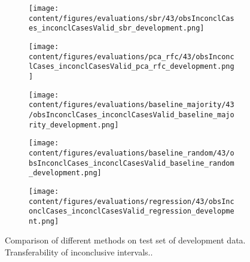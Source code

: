 \begin{figure}[ht]
  \begin{subfigure}{0.5\textwidth}
    \centering
    \texttt{[image: content/figures/evaluations/sbr/43/obsInconclCases\_inconclCasesValid\_sbr\_development.png]}
  \end{subfigure}
  \hfill
  \begin{subfigure}{0.5\textwidth}
    \centering
    \texttt{[image: content/figures/evaluations/pca\_rfc/43/obsInconclCases\_inconclCasesValid\_pca\_rfc\_development.png]}
  \end{subfigure}
  \hfill
  \begin{subfigure}{0.5\textwidth}
    \centering
    \texttt{[image: content/figures/evaluations/baseline\_majority/43/obsInconclCases\_inconclCasesValid\_baseline\_majority\_development.png]}
  \end{subfigure}
  \hfill
  \begin{subfigure}{0.5\textwidth}
    \centering
    \texttt{[image: content/figures/evaluations/baseline\_random/43/obsInconclCases\_inconclCasesValid\_baseline\_random\_development.png]}
  \end{subfigure}
  \hfill
  \begin{subfigure}{0.5\textwidth}
    \centering
    \texttt{[image: content/figures/evaluations/regression/43/obsInconclCases\_inconclCasesValid\_regression\_development.png]}
  \end{subfigure}

  \caption{Comparison of different methods on test set of development data. Transferability of inconclusive intervals..}
  \label{fig:test_interval_match_dev}
\end{figure}


